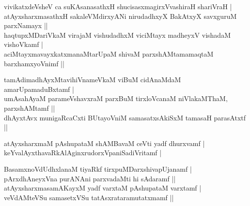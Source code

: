 \begin{entry}
\smallskip
\begin{shl}
vivikatxdeVsheV ca suKAsanasathxH shucisasxmagirxVvashiraH shariVraH |\\[1pt]
atAyxsharxmasathxH sakaleVMdirxyANi nirudadhxyX BakAtxyX savxguruM parxNamayx ||\\[1pt]
haqtupxMDariVkaM virajaM vishudadhxM viciMtayx madheyxV vishadaM vishoVkamf |\\[1pt]
aciMtayxmavayxkatxmanaMtarUpaM shivaM parxshAMtamamaqtaM barxhamxyoVnimf ||
\end{shl}
\begin{shl}
tamAdimadhAyxMtavihiVnameVkaM viBuM cidAnaMdaM amarUpamaduBxtamf |\\[1pt]
umAsahAyaM parameVshavxraM parxBuM tirxloVcanaM niVlakaMThaM, parxshAMtamf ||\\[1pt]
dhAyxtAvx munigaRcaCxti BUtayoVniM samasatxsAkiSxM tamasaH parasAtxtf ||
\end{shl}
\medskip
{}
\smallskip
\begin{shl}
atAyxsharxmaM pAshupataM shAMBavaM ceVti yadf dhurxvamf |\\[1pt]
keYvalAyxthavaRkAlAginxrudorxVpaniSadiVritamf |
\end{shl}
\medskip
{}
\smallskip
{}
\smallskip
\begin{shl}
BasamxnoVdUdhxlanaM tiyaRkf tirxpuMDarxshivapUjanamf |\\[1pt]
pArxdhAneyxVna purANAni parxvadaMti hi sAdaramf ||\\[3pt]
atAyxsharxmasamAKayxM yadf varxtaM pAshupataM varxtamf |\\[1pt]
veVdAMteVSu samasetxVSu tatAsxrataramutatxmamf ||
\end{shl}
\medskip
{}
\smallskip
{}
\smallskip
{}
\end{entry}

